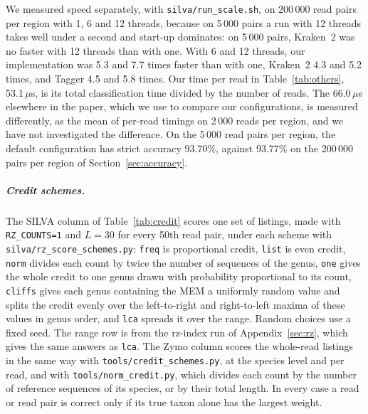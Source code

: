 We measured speed separately, with \texttt{silva/run\_scale.sh}, on 200\,000 read pairs per region with 1, 6 and 12 threads, because on 5\,000 pairs a run with 12 threads takes well under a second and start-up dominates: on 5\,000 pairs, Kraken~2 was no faster with 12 threads than with one.
With 6 and 12 threads, our implementation was 5.3 and 7.7 times faster than with one, Kraken~2 4.3 and 5.2 times, and Tagger 4.5 and 5.8 times.
Our time per read in Table~\ref{tab:others}, 53.1\,$\mu$s, is its total classification time divided by the number of reads.
The 66.0\,$\mu$s elsewhere in the paper, which we use to compare our configurations, is measured differently, as the mean of per-read timings on 2\,000 reads per region, and we have not investigated the difference.
On the 5\,000 read pairs per region, the default configuration has strict accuracy 93.70\%, against 93.77\% on the 200\,000 pairs per region of Section~\ref{sec:accuracy}.

\subparagraph*{Credit schemes.}
The SILVA column of Table~\ref{tab:credit} scores one set of listings, made with \nolinkurl{RZ_COUNTS=1} and $L = 30$ for every 50th read pair, under each scheme with \nolinkurl{silva/rz_score_schemes.py}: \texttt{freq} is proportional credit, \texttt{list} is even credit, \texttt{norm} divides each count by twice the number of sequences of the genus, \texttt{one} gives the whole credit to one genus drawn with probability proportional to its count, \texttt{cliffs} gives each genus containing the MEM a uniformly random value and splits the credit evenly over the left-to-right and right-to-left maxima of these values in genus order, and \texttt{lca} spreads it over the range.
Random choices use a fixed seed.
The range row is from the rz-index run of Appendix~\ref{sec:rz}, which gives the same answers as \texttt{lca}.
The Zymo column scores the whole-read listings in the same way with \nolinkurl{tools/credit_schemes.py}, at the species level and per read, and with \nolinkurl{tools/norm_credit.py}, which divides each count by the number of reference sequences of its species, or by their total length.
In every case a read or read pair is correct only if its true taxon alone has the largest weight.

